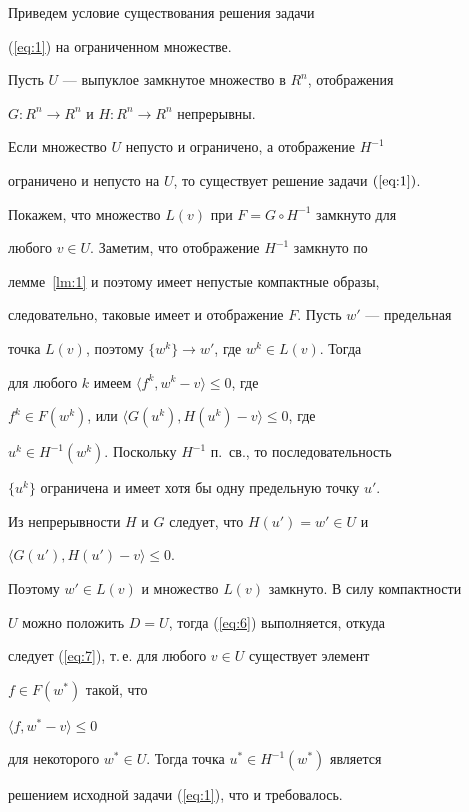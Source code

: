 Приведем условие существования решения задачи 


(\ref{eq:1}) на ограниченном множестве.








\begin{prop} \label{pro:2}


Пусть $U$ --- выпуклое замкнутое множество в $R^{n} $, отображения


$G: R^{n} \rightarrow R^{n} $ и $H: R^{n} \rightarrow R^{n} $ непрерывны. 


Если множество $U$ непусто и ограничено, а отображение $H^{-1}$ 


ограничено и непусто на $U$, то существует решение задачи $(\ref{eq:1})$.


\end{prop}





\begin{pf}


Покажем, что множество $L(v)$ при $F=G \circ H^{-1}$ замкнуто для 


любого $v \in U$. Заметим, что отображение $H^{-1}$ замкнуто по 


лемме~\ref{lm:1} и поэтому имеет непустые компактные образы, 


следовательно, таковые имеет и отображение $F$. Пусть $w'$ --- предельная 


точка $L(v)$, поэтому $\{w^{k}\} \rightarrow w'$, где $w^{k} \in L(v)$. Тогда 


для любого $k$ имеем $\langle f^{k}, w^{k}-v \rangle \leq 0$, где


$f^{k} \in F(w^{k})$, или $\langle G(u^{k}), H(u^{k})-v \rangle \leq 0$, где 


$u^{k} \in H^{-1}(w^{k})$. Поскольку $H^{-1}$ п.~св., то последовательность 


$\{ u^{k} \}$ ограничена и имеет хотя бы одну предельную точку $u'$. 


Из непрерывности $H$ и $G$ следует, что $H(u')=w' \in U$ и 


$\langle G(u'), H(u')-v \rangle \leq 0$.


Поэтому $w' \in L(v)$ и множество $L(v)$ замкнуто. В силу компактности 


$U$ можно положить $D=U$, тогда (\ref{eq:6}) выполняется, откуда 


следует (\ref{eq:7}), т.\,е. для любого $v \in U$ существует элемент 


$f \in F(w^{*})$ такой, что 


$\langle f, w^{*}-v \rangle \leq 0$


для некоторого $w^{*} \in U$. Тогда точка $u^{*} \in H^{-1}(w^{*})$ является 


решением исходной задачи (\ref{eq:1}), что и требовалось.


\end{pf}





